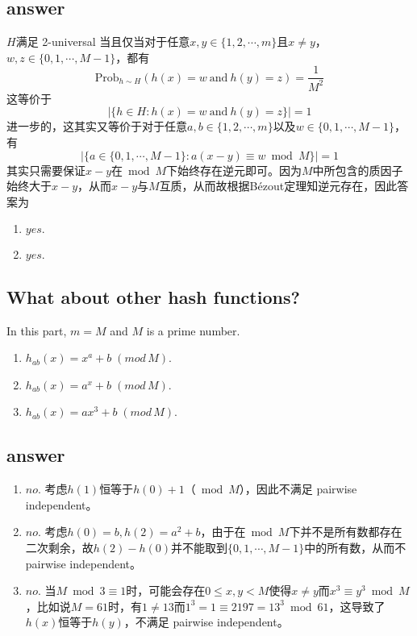 \documentclass[12pt]{article}
\begin{document}
\subsection*{answer}

$H$满足 2-universal 当且仅当对于任意$x, y \in \{1, 2, \cdots, m\}$且$x \neq y$，$ w, z \in \{0, 1, \cdots, M-1\}$，都有
\begin{equation}
\text{Prob}_{h \sim H}\left(h(x) = w\ \text{and}\ h(y) = z\right) = \frac{1}{M^2}
\end{equation}
这等价于
\begin{equation}
\left|\{h \in H: h(x) = w\ \text{and}\ h(y) = z\}\right| = 1
\end{equation}
进一步的，这其实又等价于对于任意$a, b \in \{1,2,\cdots,m\}$以及$w \in \{0, 1, \cdots, M-1\}$，有
\begin{equation}
|\{a \in \{0, 1, \cdots, M-1\}: a(x - y) \equiv w \bmod M\}| = 1
\end{equation}
其实只需要保证$x-y$在$\bmod M$下始终存在逆元即可。因为$M$中所包含的质因子始终大于$x-y$，从而$x-y$与$M$互质，从而故根据Bézout定理知逆元存在，因此答案为

\begin{enumerate}
	\item $yes.$
	\item $yes.$
\end{enumerate}

\subsection{What about other hash functions?}
In this part, $m = M$ and $M$ is a prime number.
\begin{enumerate}
    \item 
    $h_{ab}(x) = x^a + b \; (mod \, M)$.
    \item
    $h_{ab}(x) = a^x + b \; (mod \, M)$.
    \item
    $h_{ab}(x) = ax^3 + b \; (mod \, M)$.
\end{enumerate}

\subsection*{answer}
\begin{enumerate}
	\item $no.$ 考虑$h(1)$恒等于$h(0) + 1$（$\bmod M$），因此不满足 pairwise independent。
	\item $no.$ 考虑$h(0) = b, h(2) = a^2 + b$，由于在$\bmod M$下并不是所有数都存在二次剩余，故$h(2) - h(0)$并不能取到$\{0, 1, \cdots, M-1\}$中的所有数，从而不 pairwise independent。
	\item $no.$ 当$M \bmod 3 \equiv 1$时，可能会存在$0 \le x, y < M$使得$x \neq y$而$x^3 \equiv y^3 \bmod M$，比如说$M = 61$时，有$1 \neq 13$而$1^3 = 1 \equiv 2197 = 13^3 \bmod 61$，这导致了$h(x)$恒等于$h(y)$，不满足 pairwise independent。
\end{enumerate}
\end{document}
